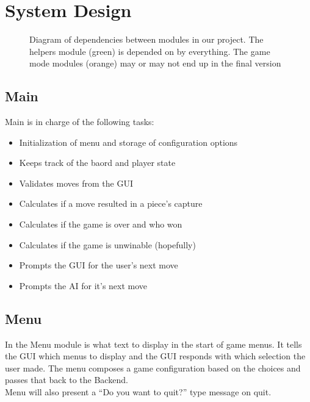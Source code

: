 \documentclass[11pt, oneside]{article}
\begin{document}
\section{System Design}
\begin{figure}[H]\label{fig:MDD}
  \centering
  \caption{Diagram of dependencies between modules in our project. The helpers
    module (green) is depended on by everything. The game mode modules (orange)
    may or may not end up in the final version}
\end{figure}

\subsection{Main}
Main is in charge of the following tasks:
\begin{itemize}
\item Initialization of menu and storage of configuration options
\item Keeps track of the baord and player state
\item Validates moves from the GUI
\item Calculates if a move resulted in a piece's capture
\item Calculates if the game is over and who won
\item Calculates if the game is unwinable (hopefully)
\item Prompts the GUI for the user's next move
\item Prompts the AI for it's next move
\end{itemize}

\subsection{Menu}
In the Menu module is what text to display in the start of game menus. It tells
the GUI which menus to display and the GUI responds with which selection the
user made. The menu composes a game configuration based on the choices and
passes that back to the Backend.\\
Menu will also present a ``Do you want to quit?'' type message on quit.
\end{document}
